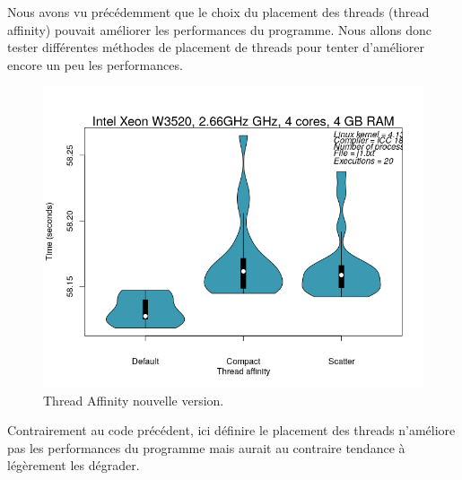 \documentclass[
 aip,
 jmp,
 amsmath,amssymb,
 reprint
]{revtex4-1}
\begin{document}
Nous avons vu précédemment que le choix du placement des threads (thread affinity) pouvait améliorer les performances du programme. Nous allons donc tester différentes méthodes de placement de threads pour tenter d'améliorer encore un peu les performances.

\begin{figure}[H]
  \includegraphics[width=\linewidth, keepaspectratio=true]{defaultVSscatterVScompact_v2.png}
  \caption{Thread Affinity nouvelle version.\label{Fig:affinity_v2}}
\end{figure}

Contrairement au code précédent, ici définire le placement des threads n'améliore pas les performances du programme mais aurait au contraire tendance à légèrement les dégrader.
\end{document}
